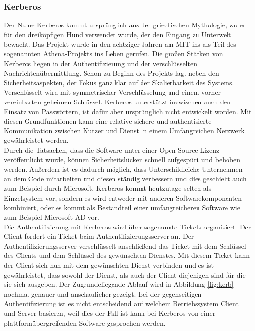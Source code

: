 \documentclass[
book,
a4paper,   
titlepage,  
halfparskip,
12pt        
]{scrartcl}
\begin{document}
\begin{onehalfspacing}
\subsubsection{Kerberos}
Der Name Kerberos kommt ursprünglich aus der griechischen Mythologie, wo er für den dreiköpfigen Hund verwendet wurde, der den Eingang zu Unterwelt bewacht. 
Das Projekt wurde in den achtziger Jahren am \ac{MIT} ins als Teil des sogenannten Athena-Projekts ins Leben gerufen. Die großen Stärken von Kerberos liegen in der Authentifizierung und der verschlüsselten Nachrichtenübermittlung. Schon zu Beginn des Projekts lag, neben den Sicherheitsaspekten, der Fokus ganz klar auf der Skalierbarkeit des Systems. 
Verschlüsselt wird mit symmetrischer Verschlüsselung und einem vorher vereinbarten geheimen Schlüssel. Kerberos unterstützt inzwischen auch den Einsatz von Passwörtern, ist dafür aber ursprünglich nicht entwickelt worden. 
Mit diesen Grundfunktionen kann eine relative sichere und authentisierte Kommunikation zwischen Nutzer und Dienst in einem Umfangreichen Netzwerk gewährleistet werden.\\
Durch die Tatsachen, dass die Software unter einer Open-Source-Lizenz veröffentlicht wurde, können Sicherheitslücken schnell aufgespürt und behoben werden. Außerdem ist es dadurch möglich, dass Unterschildleiche Unternehmen an dem Code mitarbeiten und diesen ständig verbessern und dies geschieht auch zum Beispiel durch Microsoft. Kerberos kommt heutzutage selten als Einzelsystem vor, sondern es wird entweder mit anderen Softwarekomponenten kombiniert, oder es kommt als Bestandteil einer umfangreicheren Software wie zum Beispiel Microsoft \ac{AD} vor.\cite[S. 137f]{kerberos2}\\
Die Authentifizierung mit Kerberos wird über sogenannte Tickets organisiert. Der Client fordert ein Ticket beim Authentifizierungsserver an. Der Authentifizierungsserver verschlüsselt anschließend das Ticket mit dem Schlüssel des Clients und dem Schlüssel des gewünschten Dienstes. Mit diesem Ticket kann der Client sich nun mit dem gewünschten Dienst verbinden und es ist gewährleistet, dass sowohl der Dienst, als auch der Client diejenigen sind für die sie sich ausgeben.  Der Zugrundeliegende Ablauf wird in Abbildung \vref{fig:kerb} nochmal genauer und anschaulicher gezeigt. Bei der gegenseitigen Authentifizierung ist es nicht entscheidend auf welchem Betriebssystem Client und Server basieren, weil dies der Fall ist kann bei Kerberos von einer plattformübergreifenden Software gesprochen werden.
\begin{figure}[h]

\end{figure}
\end{onehalfspacing}
\end{document}
